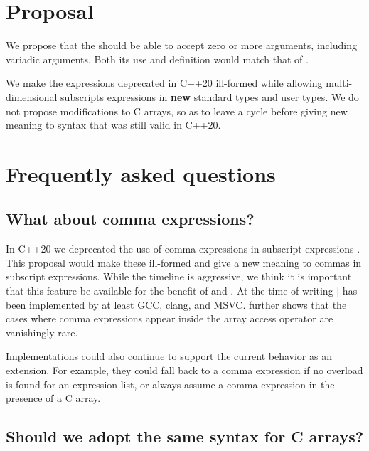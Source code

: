 \documentclass{wg21}
\begin{document}


\section{Proposal}
We propose that the  should be able to accept zero or more arguments, including variadic arguments.
Both its use and definition would match that of .

We make the expressions deprecated in C++20 ill-formed while allowing multi-dimensional subscripts expressions in \textbf{new} standard types
and user types. We do not propose modifications to C arrays, so as to leave a cycle before giving new meaning to syntax that was still valid in C++20.

\section{Frequently asked questions}

\subsection{What about comma expressions?}

In C++20 we deprecated the use of comma expressions in subscript expressions .
This proposal would make these ill-formed and give a new meaning to commas in subscript expressions.
While the timeline is aggressive, we think it is important that this feature be available for the benefit of \tcode{
} and .
At the time of writing [ has been implemented by at least GCC, clang, and MSVC.
 further shows that the cases where comma expressions appear inside the array access operator are vanishingly rare.

Implementations could also continue to support the current behavior as an extension.  For example, they could fall back to a comma expression if no overload is found for an expression list, or always assume a comma expression in the presence of a C array.

\subsection{Should we adopt the same syntax for C arrays?}
\end{document}
